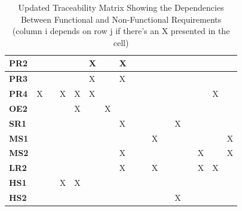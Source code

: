 \documentclass[12pt]{article}
\begin{document}
{\begin{landscape}
\begin{table}[h!]
\begin{tabular}{|p{1cm}|p{0.9cm}|p{0.9cm}|p{0.9cm}|p{0.9cm}|p{0.9cm}|p{0.9cm}|p{0.9cm}|p{0.9cm}|p{0.9cm}|p{0.9cm}|p{0.9cm}|p{0.9cm}|p{0.9cm}|p{0.9cm}|p{0.9cm}|p{0.9cm}|}
\hline
\textbf{PR2} & & & & & X & & X & & & & & & & & & \\
\hline
\textbf{PR3} & & & & & X & & X & & & & & & & & & \\
\hline
\textbf{PR4} & X &  & X & X & X & & & & & & & & & & X \\
\hline
\textbf{OE2} & & & & X & & X & & & & & & & & & & \\
\hline
\textbf{SR1} & & & & & & & X & & & & & X & & & & \\
\hline
\textbf{MS1} & & & & & & & & & & X & & & & & & X \\
\hline
\textbf{MS2} & & & & & & & X & & & & & & & X & & X \\
\hline
\textbf{LR2} & & & & & & & X & & & X & & & & X & X & \\
\hline
\textbf{HS1} & & & X & X & & & & & & & & & & & & \\
\hline
\textbf{HS2} & & & & & & & & & & & & X & & & & \\
\hline
\end{tabular}
\caption{Updated Traceability Matrix Showing the Dependencies Between Functional and Non-Functional Requirements (column i depends on row j if there's an X presented in the cell)}
\label{Table:UpdatedTraceability}
\end{table}
\end{landscape}
}


\newpage{}
\end{document}

